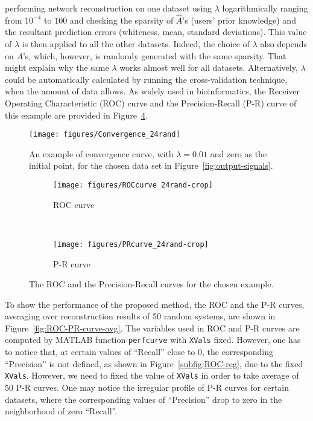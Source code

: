 \documentclass[letterpaper,10pt,journal,final]{IEEEtran}
\theoremstyle{definition}
\theoremstyle{remark}
\begin{document}
performing network reconstruction on one dataset using $\lambda$ logarithmically
ranging from $10^{-4}$ to $100$ and checking the sparsity of $\hat{A}$'s (users'
prior knowledge) and the resultant prediction errors (whiteness, mean, standard
deviations). This value of $\lambda$ is then applied to all the other
datasets. Indeed, the choice of $\lambda$ also depends on $A$'s, which, however,
is randomly generated with the same sparsity. That might explain why the same
$\lambda$ works almost well for all datasets. Alternatively, $\lambda$ could be
automatically calculated by running the cross-validation technique, when the
amount of data allows.  As widely used in bioinformatics, the Receiver Operating
Characteristic (ROC) curve and the Precision-Recall (P-R) curve of this example
are provided in Figure~\ref{fig:ROC-PR-curve}.
\begin{figure}[htb]   \centering
  \texttt{[image: figures/Convergence\_24rand]}
  \caption{An example of convergence curve, with $\lambda = 0.01$ and zero as
    the initial point, for the chosen data set in
    Figure~\ref{fig:output-signals}.}
  \label{fig:convergence-alg}
\end{figure}

\begin{figure}[htbp]
  \centering
  \begin{subfigure}[b]{0.23\textwidth}
    \texttt{[image: figures/ROCcurve\_24rand-crop]}
    \caption{ROC curve}
    \label{subfig:ROC}
  \end{subfigure}
  ~
  \begin{subfigure}[b]{0.23\textwidth}
    \texttt{[image: figures/PRcurve\_24rand-crop]}
    \caption{P-R curve}
    \label{subfig:PR}
  \end{subfigure}
  \caption{The ROC and the Precision-Recall curves for the chosen example.}
  \label{fig:ROC-PR-curve}
\end{figure}

To show the performance of the proposed method, the ROC and the P-R curves,
averaging over reconstruction results of 50 random systems, are shown in
Figure~\ref{fig:ROC-PR-curve-avg}. The variables used in ROC and P-R curves are
computed by MATLAB function \texttt{perfcurve} with \texttt{XVals}
fixed. However, one has to notice that, at certain values of ``Recall'' close to
0, the corresponding ``Precision'' is not defined, as shown in
Figure~\ref{subfig:ROC-reg}, due to the fixed \texttt{XVals}. However, we need
to fixed the value of \texttt{XVals} in order to take average of 50 P-R
curves. One may notice the irregular profile of P-R curves for certain datasets,
where the corresponding values of ``Precision'' drop to zero in the
neighborhood of zero ``Recall''.
\end{document}
